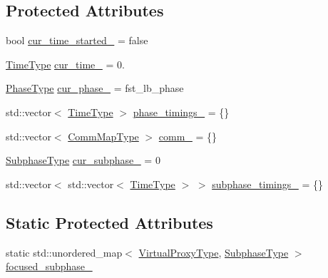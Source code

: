 \subsection*{Protected Attributes}
\begin{DoxyCompactItemize}
\item 
bool \hyperlink{structvt_1_1vrt_1_1collection_1_1balance_1_1_element_stats_a4fa029e81c6907ace700b8c3df10457f}{cur\+\_\+time\+\_\+started\+\_\+} = false
\item 
\hyperlink{namespacevt_a876a9d0cd5a952859c72de8a46881442}{Time\+Type} \hyperlink{structvt_1_1vrt_1_1collection_1_1balance_1_1_element_stats_ab0538c11d7a658e43f80c48023f7b8c6}{cur\+\_\+time\+\_\+} = 0.
\item 
\hyperlink{namespacevt_a46ce6733d5cdbd735d561b7b4029f6d7}{Phase\+Type} \hyperlink{structvt_1_1vrt_1_1collection_1_1balance_1_1_element_stats_a661531ffc78883018a8e553179f9324d}{cur\+\_\+phase\+\_\+} = fst\+\_\+lb\+\_\+phase
\item 
std\+::vector$<$ \hyperlink{namespacevt_a876a9d0cd5a952859c72de8a46881442}{Time\+Type} $>$ \hyperlink{structvt_1_1vrt_1_1collection_1_1balance_1_1_element_stats_ac3df7cd0b637aef1e0faa92bb0193542}{phase\+\_\+timings\+\_\+} = \{\}
\item 
std\+::vector$<$ \hyperlink{namespacevt_1_1vrt_1_1collection_1_1balance_a10860c956804d644db54a16012352728}{Comm\+Map\+Type} $>$ \hyperlink{structvt_1_1vrt_1_1collection_1_1balance_1_1_element_stats_a1673ce54a075060ea7e04c6e300b9682}{comm\+\_\+} = \{\}
\item 
\hyperlink{namespacevt_ae78cbfdf1e57470e33eedb074f2beeba}{Subphase\+Type} \hyperlink{structvt_1_1vrt_1_1collection_1_1balance_1_1_element_stats_a1a8a5e855950900f0f1b470ff5f6071b}{cur\+\_\+subphase\+\_\+} = 0
\item 
std\+::vector$<$ std\+::vector$<$ \hyperlink{namespacevt_a876a9d0cd5a952859c72de8a46881442}{Time\+Type} $>$ $>$ \hyperlink{structvt_1_1vrt_1_1collection_1_1balance_1_1_element_stats_a27ee2ef1979d4e4e9e4ca34fa8e88591}{subphase\+\_\+timings\+\_\+} = \{\}
\end{DoxyCompactItemize}
\subsection*{Static Protected Attributes}
\begin{DoxyCompactItemize}
\item 
static std\+::unordered\+\_\+map$<$ \hyperlink{namespacevt_a1b417dd5d684f045bb58a0ede70045ac}{Virtual\+Proxy\+Type}, \hyperlink{namespacevt_ae78cbfdf1e57470e33eedb074f2beeba}{Subphase\+Type} $>$ \hyperlink{structvt_1_1vrt_1_1collection_1_1balance_1_1_element_stats_aed2a4fb4fbcf36bf6a392907fcfb1791}{focused\+\_\+subphase\+\_\+}
\end{DoxyCompactItemize}
